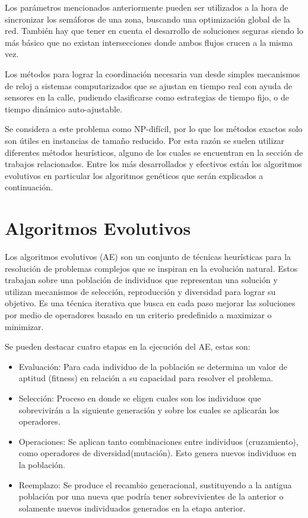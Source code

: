 Los parámetros mencionados anteriormente pueden ser utilizados a la hora de sincronizar los semáforos de una zona, buscando una optimización global de la red. También hay que tener en cuenta el desarrollo de soluciones seguras siendo lo más básico que no existan intersecciones donde ambos flujos crucen a la misma vez.

Los métodos para lograr la coordinación necesaria van desde simples mecanismos de reloj a sistemas computarizados que se ajustan en tiempo real con ayuda de sensores en la calle, pudiendo clasificarse como estrategias de tiempo fijo, o de tiempo dinámico auto-ajustable.

Se considera a este problema como NP-difícil, por lo que los métodos exactos solo son útiles en instancias de tamaño reducido. Por esta razón se suelen utilizar diferentes métodos heurísticos, alguno de los cuales se encuentran en la sección de trabajos relacionados. Entre los más desarrollados y efectivos están los algoritmos evolutivos en particular los algoritmos genéticos que serán explicados a continuación.

\section{Algoritmos Evolutivos}

Los algoritmos evolutivos (AE) son un conjunto de técnicas heurísticas para la resolución de problemas complejos que se inspiran en la evolución natural. Estos trabajan sobre una población de individuos que representan una solución y utilizan mecanismos de selección, reproducción y diversidad para lograr su objetivo. 
Es una técnica iterativa que busca en cada paso mejorar las soluciones por medio de operadores basado en un criterio predefinido a maximizar o minimizar.

Se pueden destacar cuatro etapas en la ejecución del AE, estas son:

\begin{itemize}
	\item Evaluación: Para cada individuo de la población se determina un valor de aptitud (fitness) en relación a su capacidad para resolver el problema. 
	\item Selección: Proceso en donde se eligen cuales son los individuos que sobrevivirán a la siguiente generación y sobre los cuales se aplicarán los operadores.
	\item Operaciones: Se aplican tanto combinaciones entre individuos (cruzamiento), como operadores de diversidad(mutación). Esto genera nuevos individuos en la población.
	\item Reemplazo: Se produce el recambio generacional, sustituyendo a la antigua población por una nueva que podría tener sobrevivientes de la anterior o solamente nuevos individuados generados en la etapa anterior.
\end{itemize}

